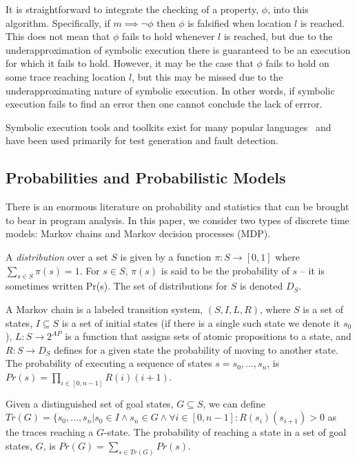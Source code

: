 It is straightforward to integrate the checking of a property,
$\phi$, into this algorithm.  Specifically,
if $m \implies \neg\phi$ then $\phi$ is falsified 
when location $l$ is reached.    This does not mean that $\phi$
fails to hold whenever $l$ is reached, but due to the underapproximation
of symbolic execution there is guaranteed to be an execution for which
it fails to hold.
However, it may be the case that $\phi$ fails to hold
on some trace reaching location $l$, but this may be missed
due to the underapproximating nature of symbolic execution.
In other words, if symbolic execution fails to find an error
then one cannot conclude the lack of errror.

Symbolic execution tools and toolkits exist for many popular 
languages~\cite{pasareanu2010symbolic,godefroid2005dart,jamrozik2013generating,cadar2008klee}
and have been used primarily for test generation and fault detection.

\subsection{Probabilities and Probabilistic Models}

There is an enormous literature on probability and statistics
that can be brought to bear in program analysis.  
In this paper, we consider two types of discrete time models:
Markov chains and Markov decision processes (MDP).

A \textit{distribution} over a set $S$ is given by a 
function $\pi : S \rightarrow [0,1]$ where
$\sum_{s \in S} \pi(s) = 1$.  For $s \in S$,
$\pi(s)$ is said to be the probability of $s$ -- it is
sometimes written Pr(s).
The set of distributions for $S$ is denoted $D_S$.

A Markov chain is a labeled transition system,
$(S,I,L,R)$, where $S$ is a set of states,
$I \subseteq S$ is a set of initial states (if there is a single
such state we denote it $s_0$), 
$L : S \rightarrow 2^{AP}$ is a function that assigns
sets of atomic propositions to a state, and
$R : S \rightarrow D_S$ defines for a given state
the probability of moving to another state.
The probability of executing a sequence of states $s = s_0, ..., s_n$, 
is $Pr(s) = \prod_{i \in [0,n-1]} R(i)(i+1)$.

Given a distinguished set of goal states, $G \subseteq S$,
we can define $Tr(G) = \{s_0, \ldots, s_n \vert s_0 \in I \wedge
s_n \in G \wedge \forall i \in [0,n-1] : R(s_i)(s_{i+1}) > 0$
as the traces reaching a $G$-state.
The probability of reaching a state in 
a set of goal states, $G$, is $Pr(G) = \sum_{s \in Tr(G)} Pr(s)$.

